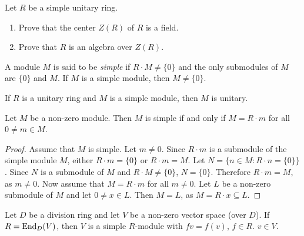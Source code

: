\begin{exercise}
\label{xca:center_simple}
Let $R$ be a simple unitary ring. 
\begin{enumerate}
    \item Prove that the center $Z(R)$ of $R$ is a field.
    \item Prove that $R$ is an algebra over $Z(R)$. 
\end{enumerate}
\end{exercise}


\begin{definition}
\label{Module!simple}
    A module $M$ is said to be 
    \emph{simple} if $R\cdot M\ne\{0\}$ and 
    the only submodules of $M$ are $\{0\}$ and $M$.
    If $M$ is a simple module, then $M\ne\{0\}$.
\end{definition}

If $R$ is a unitary ring and $M$ is a simple 
module, then $M$ is unitary. 


\begin{lemma}
	\label{lemma:simple}
	Let $M$ be a non-zero module. Then $M$ is simple if and only if $M=R\cdot m$
	for all $0\ne m\in M$.
\end{lemma}

\begin{proof}
	Assume that $M$ is simple.  Let $m\ne 0$. Since $R\cdot m$ is a submodule of the simple 
	module $M$, either $R\cdot m=\{0\}$ or $R\cdot m=M$.  Let $N=\{n\in M:R\cdot n=\{0\}\}$. Since $N$ is a 
	submodule of $M$ and $R\cdot M\ne\{0\}$, $N=\{0\}$. Therefore $R\cdot m=M$, as $m\ne0$.
	Now assume that $M=R\cdot m$ for all $m\ne0$. Let $L$ be a non-zero submodule of 
	$M$ and let $0\ne x\in L$. Then $M=L$, as $M=R\cdot x\subseteq L$. 
\end{proof} 

\begin{example}
	Let $D$ be a division ring and let $V$ be a non-zero vector space (over $D$). If 
	$R=\operatorname{End}_D(V)$, then $V$ is a simple $R$-module with $fv=f(v)$, $f\in R$.
	$v\in V$. 
\end{example}

